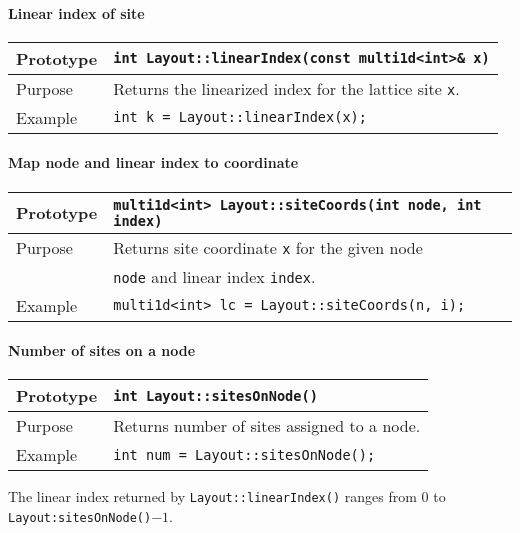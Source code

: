 \documentclass[12pt,letterpaper]{article}
\begin{document}
\paragraph{Linear index of site}

\begin{flushleft}
  \begin{tabular}{|l|l|}
  \hline
  Prototype      & \verb|int Layout::linearIndex(const multi1d<int>& x)|\\
    \hline
  Purpose        & Returns the linearized index for the lattice site \verb|x|. \\
\hline
  Example  & \verb|int k = Layout::linearIndex(x);| \\
   \hline
 \end{tabular}
\end{flushleft}

\paragraph{Map node and linear index to coordinate}

\begin{flushleft}
  \begin{tabular}{|l|l|}
  \hline
  Prototype      & \verb|multi1d<int> Layout::siteCoords(int node, int index)|\\
    \hline
  Purpose        & Returns site coordinate \verb|x| for the given node \\
                 & \verb|node| and linear index \verb|index|. \\
\hline
  Example  & \verb|multi1d<int> lc = Layout::siteCoords(n, i);| \\
   \hline
 \end{tabular}
\end{flushleft}

\paragraph{Number of sites on a node}

\begin{flushleft}
  \begin{tabular}{|l|l|}
  \hline
  Prototype      & \verb|int Layout::sitesOnNode()|\\
  \hline
  Purpose        & Returns number of sites assigned to a node.\\
  \hline
  Example        & \verb|int num = Layout::sitesOnNode();| \\
  \hline
 \end{tabular}
\end{flushleft}
%
The linear index returned by \verb|Layout::linearIndex()| 
ranges from 0 to \verb|Layout:sitesOnNode()|$ - 1$.
\end{document}

